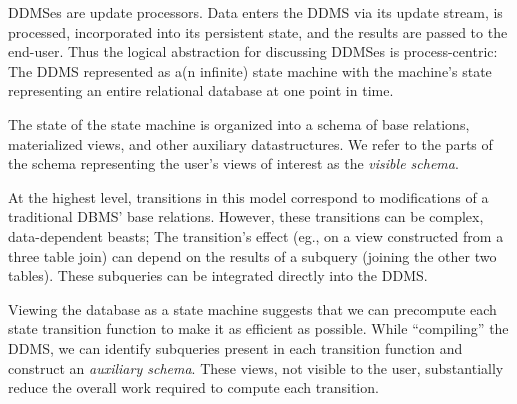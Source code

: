 

DDMSes are update processors.  Data enters the DDMS via its update stream, is
processed, incorporated into its persistent state, and the results are passed to
the end-user.  Thus the logical abstraction for discussing DDMSes is
process-centric\cite{demers-sigmod:07}: The DDMS represented as a(n infinite) state machine with the
machine's state representing an entire relational database at one point in time.

The state of the state machine is organized into a schema of
base relations, materialized views, and other auxiliary datastructures.  We
refer to the parts of the schema representing the user's views of interest as the \textit{visible schema}.

At the highest level, transitions in this model correspond to modifications of a traditional DBMS' base relations.  However, these transitions can be complex, data-dependent beasts; The transition's effect (eg., on a view constructed from a three table join) can depend on the results of a subquery (joining the other two tables).  These subqueries can be integrated directly into the DDMS.

Viewing the database as a state machine suggests that we can precompute each state transition function to make it as efficient as possible.  While ``compiling'' the DDMS, we can identify subqueries present in each transition function and construct an \textit{auxiliary schema}.  These views, not visible to the user, substantially reduce the overall work required to compute each transition.

